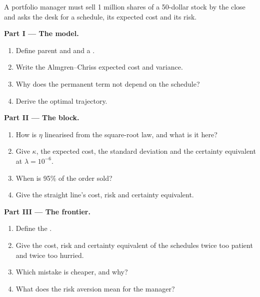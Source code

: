 \begin{problem}\label{pb:mx:the-almgren-chriss-framework:1}
A portfolio manager must sell 1 million shares of a 50-dollar stock by the close and asks the desk for a schedule, its expected cost and its risk.

\medskip\noindent\textbf{Part I --- The model.}
\begin{enumerate}
\item Define parent and  and a .
\item Write the Almgren--Chriss expected cost and variance.
\item Why does the permanent term not depend on the schedule?
\item Derive the optimal trajectory.
\end{enumerate}

\medskip\noindent\textbf{Part II --- The block.}
\begin{enumerate}[resume]
\item How is $\eta$ linearised from the square-root law, and what is it here?
\item Give $\kappa$, the expected cost, the standard deviation and the certainty equivalent at $\lambda=10^{-6}$.
\item When is 95\% of the order sold?
\item Give the straight line's cost, risk and certainty equivalent.
\end{enumerate}

\medskip\noindent\textbf{Part III --- The frontier.}
\begin{enumerate}[resume]
\item Define the .
\item Give the cost, risk and certainty equivalent of the schedules twice too patient and twice too hurried.
\item Which mistake is cheaper, and why?
\item What does the risk aversion mean for the manager?
\end{enumerate}


\end{problem}
